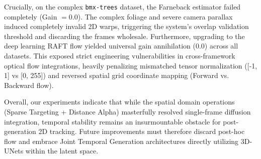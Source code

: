 Crucially, on the complex \texttt{bmx-trees} dataset, the Farneback estimator failed completely (Gain $= 0.0$). The complex foliage and severe camera parallax induced completely invalid 2D warps, triggering the system's overlap validation threshold and discarding the frames wholesale. Furthermore, upgrading to the deep learning RAFT flow yielded universal gain annihilation ($0.0$) across all datasets. This exposed strict engineering vulnerabilities in cross-framework optical flow integrations, heavily penalizing mismatched tensor normalization ([-1, 1] vs [0, 255]) and reversed spatial grid coordinate mapping (Forward vs. Backward flow).

Overall, our experiments indicate that while the spatial domain operations (Sparse Targeting + Distance Alpha) masterfully resolved single-frame diffusion integration, temporal stability remains an insurmountable obstacle for post-generation 2D tracking. Future improvements must therefore discard post-hoc flow and embrace Joint Temporal Generation architectures directly utilizing 3D-UNets within the latent space.
